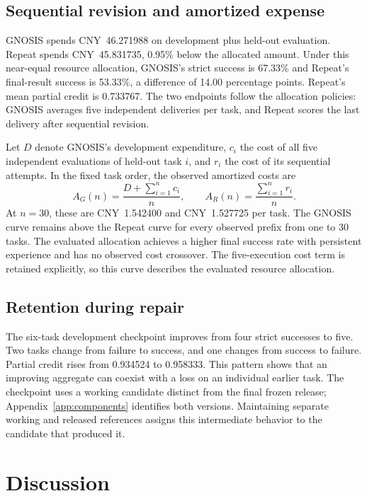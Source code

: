 \documentclass{ecai}
\begin{document}
\subsection{Sequential revision and amortized expense}

GNOSIS spends CNY~46.271988 on development plus held-out evaluation. Repeat spends CNY~45.831735, 0.95\% below the allocated amount. Under this near-equal resource allocation, GNOSIS's strict success is 67.33\% and Repeat's final-result success is 53.33\%, a difference of 14.00 percentage points. Repeat's mean partial credit is 0.733767. The two endpoints follow the allocation policies: GNOSIS averages five independent deliveries per task, and Repeat scores the last delivery after sequential revision.

Let $D$ denote GNOSIS's development expenditure, $c_i$ the cost of all five independent evaluations of held-out task $i$, and $r_i$ the cost of its sequential attempts. In the fixed task order, the observed amortized costs are
\begin{equation}
A_G(n)=\frac{D+\sum_{i=1}^{n}c_i}{n},\qquad
A_R(n)=\frac{\sum_{i=1}^{n}r_i}{n}.
\label{eq:amortization}
\end{equation}
At $n=30$, these are CNY~1.542400 and CNY~1.527725 per task. The GNOSIS curve remains above the Repeat curve for every observed prefix from one to 30 tasks. The evaluated allocation achieves a higher final success rate with persistent experience and has no observed cost crossover. The five-execution cost term is retained explicitly, so this curve describes the evaluated resource allocation.

\subsection{Retention during repair}

The six-task development checkpoint improves from four strict successes to five. Two tasks change from failure to success, and one changes from success to failure. Partial credit rises from 0.934524 to 0.958333. This pattern shows that an improving aggregate can coexist with a loss on an individual earlier task. The checkpoint uses a working candidate distinct from the final frozen release; Appendix~\ref{app:components} identifies both versions. Maintaining separate working and released references assigns this intermediate behavior to the candidate that produced it.

\section{Discussion}
\label{sec:discussion}
\end{document}
